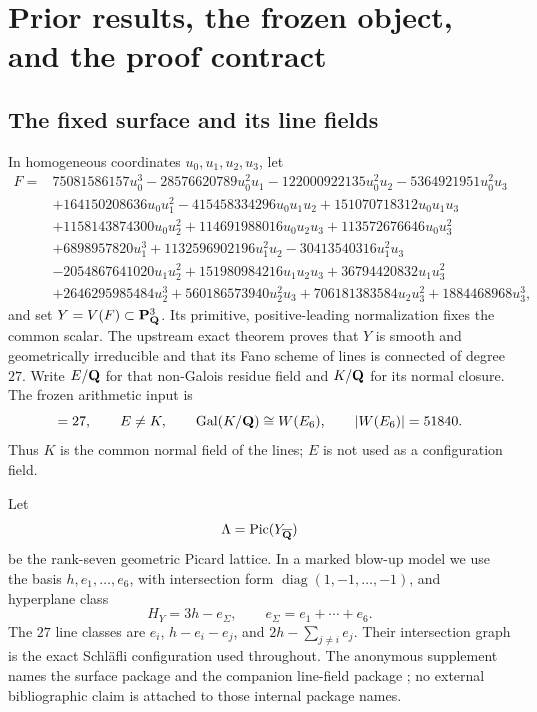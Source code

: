 \section{Prior results, the frozen object, and the proof contract}
\label{sec:setup-sources}

\subsection{The fixed surface and its line fields}

In homogeneous coordinates \(u_0,u_1,u_2,u_3\), let
\begin{align}
F={}&75081586157u_0^3-28576620789u_0^2u_1
-122000922135u_0^2u_2-5364921951u_0^2u_3\nonumber\\
&+164150208636u_0u_1^2-415458334296u_0u_1u_2
+151070718312u_0u_1u_3\nonumber\\
&+1158143874300u_0u_2^2+114691988016u_0u_2u_3
+113572676646u_0u_3^2\nonumber\\
&+6898957820u_1^3+1132596902196u_1^2u_2
-30413540316u_1^2u_3\nonumber\\
&-2054867641020u_1u_2^2+151980984216u_1u_2u_3
+36794420832u_1u_3^2\nonumber\\
&+2646295985484u_2^3+560186573940u_2^2u_3
+706181383584u_2u_3^2+1884468968u_3^3,
\label{eq:cubic}
\end{align}
and set \(Y=V(F)\subset\mathbf P^3_{\mathbf Q}\).  Its primitive, positive-leading
normalization fixes the common scalar.  The upstream exact theorem proves
that \(Y\) is smooth and geometrically irreducible and that its Fano scheme
of lines is connected of degree \(27\).  Write \(E/\mathbf Q\) for that non-Galois
residue field and \(K/\mathbf Q\) for its normal closure.  The frozen arithmetic
input is
\begin{equation}
 [E:\Q]=27,\qquad E\ne K,\qquad
 \Gal(K/\Q)\cong\WE,\qquad |\WE|=51840.
\label{eq:frozen-line-field}
\end{equation}
Thus \(K\) is the common normal field of the lines; \(E\) is not used as a
configuration field.

Let
\[
 \Lambda=\operatorname{Pic}(Y_{\overline{\mathbf Q}})
\]
be the rank-seven geometric Picard lattice.  In a marked blow-up model we use
the basis \(h,e_1,\ldots,e_6\), with intersection form
\(\operatorname{diag}(1,-1,\ldots,-1)\), and hyperplane class
\begin{equation}
 H_Y=3h-e_\Sigma,\qquad e_\Sigma=e_1+\cdots+e_6.
\label{eq:picard-basis}
\end{equation}
The \(27\) line classes are \(e_i\), \(h-e_i-e_j\), and
\(2h-\sum_{j\ne i}e_j\).  Their intersection graph is the exact
Schl\"afli configuration used throughout.  The anonymous supplement names the
surface package  and the companion
line-field package ; no external
bibliographic claim is attached to those internal package names.


